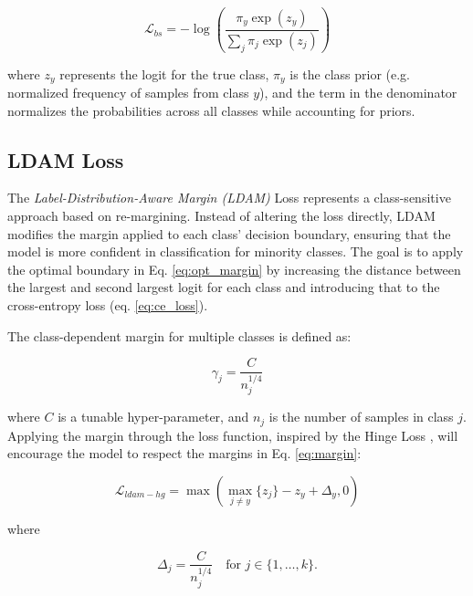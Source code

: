 \begin{equation}
    \mathcal{L}_{bs} = - \log\left( \frac{\pi_y \exp(z_y)}{\sum_j \pi_j \exp(z_j)} \right)
\end{equation}

\noindent where $z_y$ represents the logit for the true class, $\pi_y$ is the class prior (e.g. normalized frequency of samples from class $y$), and the term in the denominator normalizes the probabilities across all classes while accounting for priors.




\subsection{LDAM Loss}
\label{sec:ldam_loss}
The \emph{Label-Distribution-Aware Margin (LDAM)} Loss \cite{cao2019learningimbalanceddatasetslabeldistributionaware} represents a class-sensitive approach based on re-margining. Instead of altering the loss directly, LDAM modifies the margin applied to each class' decision boundary, ensuring that the model is more confident in classification for minority classes. The goal is to apply the optimal boundary in Eq. \eqref{eq:opt_margin} by increasing the distance between the largest and second largest logit for each class and introducing that to the cross-entropy loss (eq. \eqref{eq:ce_loss}).


The class-dependent margin for multiple classes is defined as:

\begin{equation}
    \label{eq:margin}
    \gamma_j = \frac{C}{n^{1/4}_j}
\end{equation}

\noindent where $C$ is a tunable hyper-parameter, and $n_j$ is the number of samples in class $j$. Applying the margin through the loss function, inspired by the Hinge Loss \cite{cao2019learningimbalanceddatasetslabeldistributionaware}, will encourage the model to respect the margins in Eq. \eqref{eq:margin}:

\begin{equation}
    \label{eq:ldam-hg}
    \mathcal{L}_{ldam-hg} = \max\left(\max_{j \neq y}\{z_j\} - z_y + \Delta_y, 0\right)
\end{equation}

\noindent where

\begin{equation}
    \Delta_j = \frac{C}{n_j^{1/4}} \quad \text{for } j \in \{1, \dots, k\}.
\end{equation}

